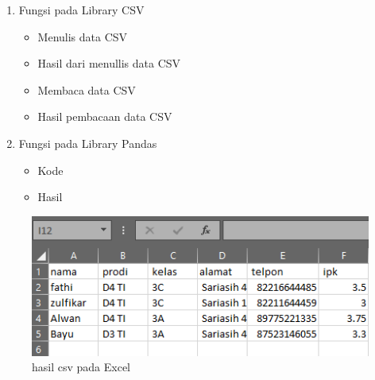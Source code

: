 \begin{enumerate}
\item Fungsi pada Library CSV
\begin{itemize}
\item Menulis data CSV

\item Hasil dari menullis data CSV

\item Membaca data CSV

\item Hasil pembacaan data CSV

\end{itemize}

\item Fungsi pada Library Pandas
\begin{itemize}
\item Kode

\item Hasil

\end{itemize}
\end{enumerate}

\begin{figure}[!htbp]
	\centering
	\includegraphics[width=1\textwidth]{figures/chapter4/1164074/1}
	\caption{hasil csv pada Excel}
	\label{fig1}
\end{figure}

